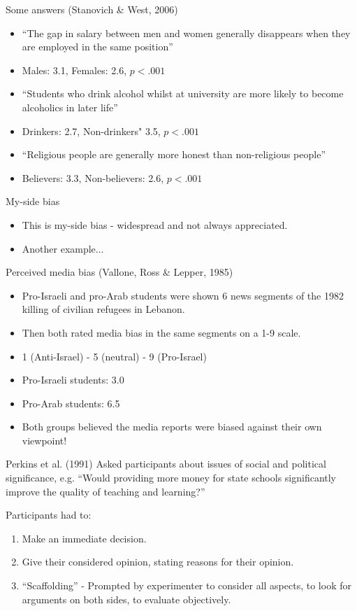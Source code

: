 \documentclass{beamer}
\begin{document}
\begin{frame}{Some answers (Stanovich \& West, 2006)}
\begin{itemize}
\item ``The gap in salary between men and women generally disappears when they are employed in the same position''
\item Males: 3.1, Females: 2.6, $p<.001$
\item ``Students who drink alcohol whilst at university are more likely to become alcoholics in later life''
\item Drinkers: 2.7, Non-drinkers" 3.5, $p<.001$
\item ``Religious people are generally more honest than non-religious people''
\item Believers: 3.3, Non-believers: 2.6, $p<.001$
\end{itemize}
\end{frame}

\begin{frame}{My-side bias}
\begin{itemize}
\item This is my-side bias - widespread and not always appreciated.
\item Another example...
\end{itemize}
\end{frame}

\begin{frame}{Perceived media bias (Vallone, Ross \& Lepper, 1985)}
\begin{itemize}
\item Pro-Israeli and pro-Arab students were shown 6 news segments of the 1982 killing of civilian refugees in Lebanon.
\item Then both rated media bias in the same segments on a 1-9 scale.
\item 1 (Anti-Israel) - 5 (neutral) - 9 (Pro-Israel)
\item Pro-Israeli students:  3.0
\item Pro-Arab students: 6.5
\item Both groups believed the media reports were biased against their own viewpoint!
\end{itemize}
\end{frame}

\begin{frame}{Perkins et al. (1991)}
Asked participants about issues of social and political significance, e.g. ``Would providing more money for state schools significantly improve the quality of teaching and learning?''

Participants had to:
\begin{enumerate}
\item Make an immediate decision.
\item Give their considered opinion, stating reasons for their opinion.
\item ``Scaffolding'' - Prompted by experimenter to consider all aspects, to look for arguments on both sides, to evaluate objectively.
\end{enumerate}
\end{frame}
\end{document}

